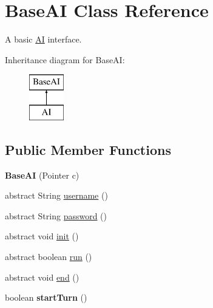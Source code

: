 \hypertarget{classBaseAI}{
\section{BaseAI Class Reference}
\label{classBaseAI}
}


A basic \hyperlink{classAI}{AI} interface.  


Inheritance diagram for BaseAI:\begin{figure}[H]
\begin{center}
\leavevmode
\includegraphics[height=2cm]{classBaseAI}
\end{center}
\end{figure}
\subsection*{Public Member Functions}
\begin{DoxyCompactItemize}
\item 
\hypertarget{classBaseAI_a27e93801ded2a4e1846f2b58beb37972}{
{\bfseries BaseAI} (Pointer c)}
\label{classBaseAI_a27e93801ded2a4e1846f2b58beb37972}

\item 
abstract String \hyperlink{classBaseAI_aa26770dd7db8dd0c4466dd770d4e05ba}{username} ()
\item 
abstract String \hyperlink{classBaseAI_a8607533e2b5bd9920ded593ae6509f48}{password} ()
\item 
abstract void \hyperlink{classBaseAI_a71b49f4ca248bfd32a9f9557cb6d494a}{init} ()
\item 
abstract boolean \hyperlink{classBaseAI_a56c96a58c1f1e93d17f9817711a45594}{run} ()
\item 
abstract void \hyperlink{classBaseAI_afb1c3a00ed081e9efdfff9f7d1e6910d}{end} ()
\item 
\hypertarget{classBaseAI_a862e05b3099817fcceb55beeef7225fe}{
boolean {\bfseries startTurn} ()}
\label{classBaseAI_a862e05b3099817fcceb55beeef7225fe}

\end{DoxyCompactItemize}
